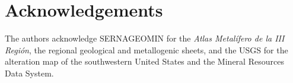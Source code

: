 \documentclass[preprint,authoryear,number]{elsarticle}
\begin{document}
\section*{Acknowledgements}

The authors acknowledge SERNAGEOMIN for the \emph{Atlas Metal\'ifero de la III Regi\'on}, the regional geological and metallogenic sheets, and the USGS for the alteration map of the southwestern United States \citep{Rockwell2017} and the Mineral Resources Data System.



\end{document}
